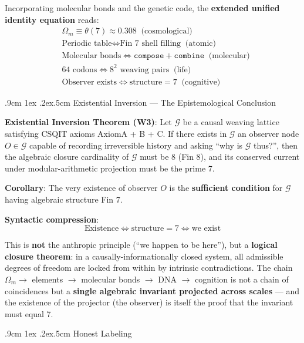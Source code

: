 \documentclass[aps,prd,twocolumn,nofootinbib,floatfix]{revtex4-2}
\makeatletter
\def\subsection{%
  \@startsection{subsection}{2}{\z@}
    {.9cm \@plus1ex \@minus .2ex}{.5cm}
    {\normalfont\normalsize\bfseries\centering}%
}
\makeatother
\begin{document}
Incorporating molecular bonds and the genetic code, the \textbf{extended unified identity equation} reads:
\[
\boxed{
\begin{aligned}
&\Omega_m \equiv \theta(7) \approx 0.308 \;\; \text{(cosmological)} \\
&\text{Periodic table} \iff \text{Fin 7 shell filling} \;\; \text{(atomic)} \\
&\text{Molecular bonds} \iff \texttt{compose}+\texttt{combine} \;\; \text{(molecular)} \\
&64\text{ codons} \iff 8^2\text{ weaving pairs} \;\; \text{(life)} \\
&\text{Observer exists} \iff \text{structure}=7 \;\; \text{(cognitive)}
\end{aligned}
}
\]

\subsection{Existential Inversion --- The Epistemological Conclusion}

\textbf{Existential Inversion Theorem (W3)}: Let $\mathcal{G}$ be a causal weaving lattice satisfying CSQIT axioms AxiomA + B + C. If there exists in $\mathcal{G}$ an observer node $O \in \mathcal{G}$ capable of recording irreversible history and asking ``why is $\mathcal{G}$ thus?'', then the algebraic closure cardinality of $\mathcal{G}$ must be 8 (Fin 8), and its conserved current under modular-arithmetic projection must be the prime 7.

\textbf{Corollary}: The very existence of observer $O$ is the \textbf{sufficient condition} for $\mathcal{G}$ having algebraic structure Fin 7.

\textbf{Syntactic compression}:
\[
\boxed{\text{Existence} \iff \text{structure}=7 \iff \text{we exist}}
\]

This is \textbf{not} the anthropic principle (``we happen to be here''), but a \textbf{logical closure theorem}: in a causally-informationally closed system, all admissible degrees of freedom are locked from within by intrinsic contradictions. The chain $\Omega_m \to$ elements $\to$ molecular bonds $\to$ DNA $\to$ cognition is not a chain of coincidences but a \textbf{single algebraic invariant projected across scales} --- and the existence of the projector (the observer) is itself the proof that the invariant must equal 7.

\subsection{Honest Labeling}
\end{document}
